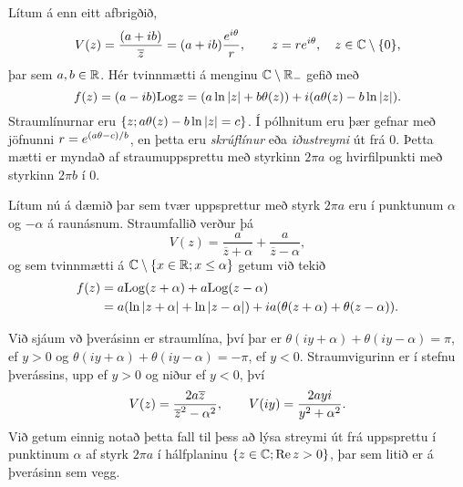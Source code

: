 \begin{sy} Lítum á enn eitt afbrigðið, 
 \begin{equation*}V(z)=\dfrac {(a+ib)}{\overline z}= (a+ib)\dfrac {e\sp{i\theta}}r, \qquad
z=re\sp{i\theta}, \quad z\in {\mathbb C}\setminus{\{0\}},
\label{4.7.9}
 \end{equation*}
þar sem $a,b\in {\mathbb R}$.
Hér tvinnmætti á menginu ${\mathbb C}\setminus {\mathbb R}_-$ gefið með
 $$f(z)=(a-ib){\operatorname{Log}} z=(a\ln |z| + b\theta(z))+i(a\theta(z)-b\ln |z|).
 $$
Straumlínurnar eru ${\{z;a\theta(z)-b\ln |z|=c\}}$.  Í pólhnitum
eru þær gefnar með jöfnunni $r=e\sp{(a\theta-c)/b}$, en þetta eru
{\it skrúflínur}  eða {\it iðustreymi} 
út frá $0$.  Þetta mætti er myndað af straumuppsprettu með
styrkinn $2\pi a$ og  hvirfilpunkti með styrkinn $2\pi b$ í $0$.
\end{sy}





\begin{sy}  Lítum nú á dæmið þar sem tvær uppsprettur með styrk $2\pi a$ eru
í punktunum $\alpha$ og $-\alpha$ á raunásnum.  Straumfallið verður
þá
 $$V(z)= \dfrac a{\overline z+\alpha}+\dfrac a{\overline z-\alpha},
 $$
og sem tvinnmætti á ${\mathbb C}\setminus{\{x\in {\mathbb R}; x\leq \alpha\}}$ getum
við tekið 
\begin{align*}
f(z)&= a{\operatorname{Log}}(z+\alpha)+a{\operatorname{Log}}(z-\alpha) \\
&=
a(\ln|z+\alpha|+\ln|z-\alpha|)+ia(\theta(z+\alpha)+\theta(z-\alpha)).
\end{align*}

Við sjáum vð þverásinn er straumlína, því þar er
$\theta(iy+\alpha)+\theta(iy-\alpha)={\pi}$, ef $y>0$ og
$\theta(iy+\alpha)+\theta(iy-\alpha)=-{\pi}$, ef $y<0$.
Straumvigurinn er í stefnu þverássins, upp ef $y>0$ og niður
ef $y<0$, því
 $$V(z)=\dfrac{2a\overline z}{\overline z\sp 2-\alpha\sp 2},\qquad
V(iy)=\dfrac{2ayi}{y\sp 2+\alpha\sp 2}.
 $$
Við getum einnig notað þetta fall til þess að lýsa streymi út frá
uppsprettu í punktinum $\alpha$ af styrk $2\pi a$ í hálfplaninu
${\{z\in {\mathbb C}; {\operatorname{Re\, }} z>0\}}$, þar sem litið er á þverásinn sem vegg.
\end{sy}





